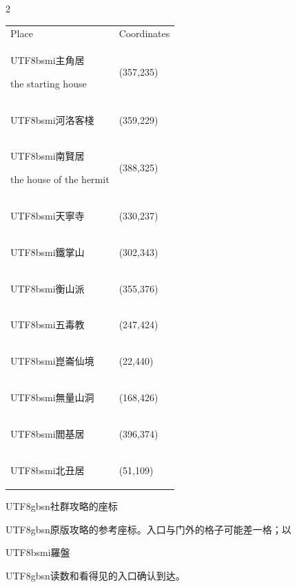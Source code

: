 \begin{paracol}{2}
{\scriptsize\begin{tabular}{@{}ll@{}}Place & Coordinates\\\begin{CJK}{UTF8}{bsmi}主角居\end{CJK} the starting house & (357,235)\\\begin{CJK}{UTF8}{bsmi}河洛客棧\end{CJK} & (359,229)\\\begin{CJK}{UTF8}{bsmi}南賢居\end{CJK} the house of the hermit & (388,325)\\\begin{CJK}{UTF8}{bsmi}天寧寺\end{CJK} & (330,237)\\\begin{CJK}{UTF8}{bsmi}鐵掌山\end{CJK} & (302,343)\\\begin{CJK}{UTF8}{bsmi}衡山派\end{CJK} & (355,376)\\\begin{CJK}{UTF8}{bsmi}五毒教\end{CJK} & (247,424)\\\begin{CJK}{UTF8}{bsmi}崑崙仙境\end{CJK} & (22,440)\\\begin{CJK}{UTF8}{bsmi}無量山洞\end{CJK} & (168,426)\\\begin{CJK}{UTF8}{bsmi}閻基居\end{CJK} & (396,374)\\\begin{CJK}{UTF8}{bsmi}北丑居\end{CJK} & (51,109)\end{tabular}\par}
\switchcolumn
\footnotesize\setlength{\parskip}{2pt}
{\footnotesize\bfseries \begin{CJK}{UTF8}{gbsn}社群攻略的座标\end{CJK}\par}
\begin{CJK}{UTF8}{gbsn}原版攻略的参考座标。入口与门外的格子可能差一格；以\end{CJK}\begin{CJK}{UTF8}{bsmi}羅盤\end{CJK}\begin{CJK}{UTF8}{gbsn}读数和看得见的入口确认到达。\end{CJK}\par

\end{paracol}
